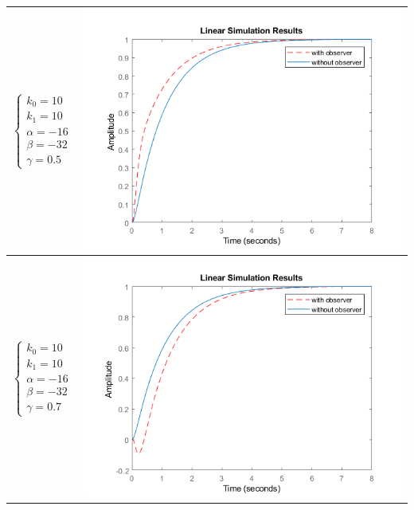 \begin{longtable}{ | m{2cm} | m{10cm} | }
		$\begin{cases} k_0=10 \\ k_1=10 \\ \alpha=-16 \\ \beta= -32 \\ \gamma=0.5 \end{cases}$ &

		\begin{minipage}{.3\textwidth}
			\includegraphics[scale = 0.6]{images/e3.png}
		\end{minipage}
		\\\hline
		
		$\begin{cases} k_0=10 \\ k_1=10 \\ \alpha=-16 \\ \beta= -32 \\ \gamma=0.7 \end{cases}$ &

		\begin{minipage}{.3\textwidth}
			\includegraphics[scale = 0.6]{images/e4.png}
		\end{minipage}
		\\\hline
		
\end{longtable}

